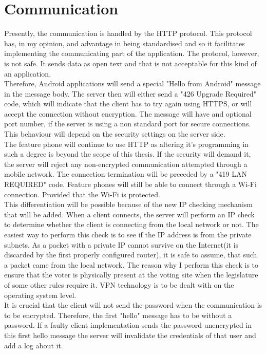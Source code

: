 \documentclass[11pt,twoside,a4paper]{book}
\begin{document}
\section{Communication}

Presently, the communication is handled by the HTTP protocol. This protocol has, in my opinion, and advantage in being standardised and so it facilitates implementing the communicating part of the application. The protocol, however, is not safe. It sends data as open text and that is not acceptable for this kind of an application.\\
 Therefore, Android applications will send a special "Hello from Android" message in the message body. The server then will either send a "426 Upgrade Required" code, which will indicate that the client has to try again using HTTPS, or will accept the connection without encryption. The message will have and optional port number, if the server is using a non standard port for secure connections. This behaviour will depend on the security settings on the server side. \\
  The feature phone will continue to use HTTP as altering it's programming in such a degree is beyond the scope of this thesis. If the security will demand it, the server will reject any non-encrypted communication attempted through a mobile network. The connection termination will be preceded by a "419 LAN REQUIRED" code. Feature phones will still be able to connect through a Wi-Fi connection. Provided that the Wi-Fi is protected.\\
 
This differentiation will be possible because of the new IP checking mechanism that will be added. When a client connects, the server will perform an IP check to determine whether the client is connecting from the local network or not. The easiest way to perform this check is to see if the IP address is from the private subnets. As a packet with a private IP cannot survive on the Internet(it is discarded by the first properly configured router), it is safe to assume, that such a packet came from the local network. The reason why I perform this check is to ensure that the voter is physically present at the voting site when the legislature of some other rules require it. VPN technology is to be dealt with on the operating system level.\\

It is crucial that the client will not send the password when the communication is to be encrypted. Therefore, the first "hello" message has to be without a password. If a faulty client implementation sends the password unencrypted in this first hello message the server will invalidate the credentials of that user and add a log about it.\\
\end{document}
